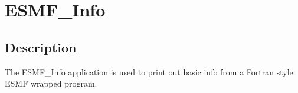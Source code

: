 \section{ESMF\_Info}
\label{sec:ESMF_Info}

\subsection{Description}

The ESMF\_Info application is used to print out basic info from a Fortran style ESMF wrapped program.  
